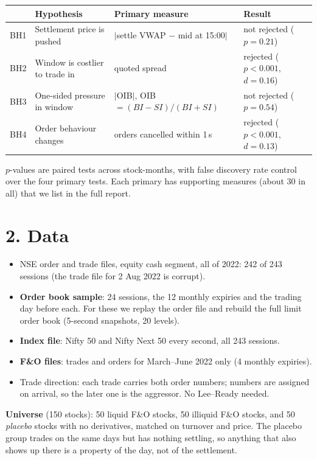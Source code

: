 \documentclass[11pt]{article}
\begin{document}
\begin{center}
\small
\begin{tabular}{llll}
\toprule
 & Hypothesis & Primary measure & Result \\
\midrule
BH1 & Settlement price is pushed & $|$settle VWAP $-$ mid at 15:00$|$ & not rejected ($p=0.21$) \\
BH2 & Window is costlier to trade in & quoted spread & rejected ($p<0.001$, $d=0.16$) \\
BH3 & One-sided pressure in window & $|$OIB$|$, OIB $=(BI-SI)/(BI+SI)$ & not rejected ($p=0.54$) \\
BH4 & Order behaviour changes & orders cancelled within 1\,s & rejected ($p<0.001$, $d=0.13$) \\
\bottomrule
\end{tabular}
\end{center}
$p$-values are paired tests across stock-months, with false discovery rate control over the four
primary tests. Each primary has supporting measures (about 30 in all) that we list in the full
report.

\section*{2. Data}

\begin{itemize}
  \item NSE order and trade files, equity cash segment, all of 2022: 242 of 243 sessions (the
  trade file for 2 Aug 2022 is corrupt).
  \item \textbf{Order book sample}: 24 sessions, the 12 monthly expiries and the trading day
  before each. For these we replay the order file and rebuild the full limit order book
  (5-second snapshots, 20 levels).
  \item \textbf{Index file}: Nifty 50 and Nifty Next 50 every second, all 243 sessions.
  \item \textbf{F\&O files}: trades and orders for March--June 2022 only (4 monthly expiries).
  \item Trade direction: each trade carries both order numbers; numbers are assigned on arrival,
  so the later one is the aggressor. No Lee--Ready needed.
\end{itemize}

\textbf{Universe} (150 stocks): 50 liquid F\&O stocks, 50 illiquid F\&O stocks, and 50
\emph{placebo} stocks with no derivatives, matched on turnover and price. The placebo group
trades on the same days but has nothing settling, so anything that also shows up there is a
property of the day, not of the settlement.
\end{document}
